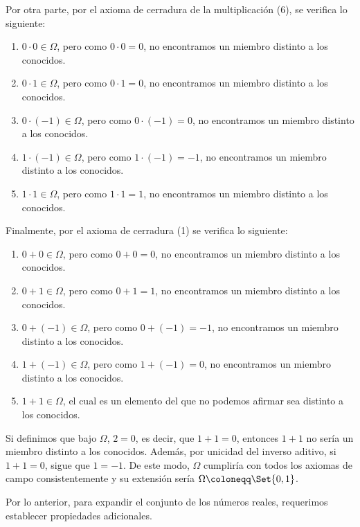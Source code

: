 \documentclass[11pt]{article}
\newcommand{\defined}{\coloneqq}
\let\set\Set
\begin{document}
Por otra parte, por el axioma de cerradura de la multiplicación (6), se verifica lo siguiente:

\begin{enumerate}[label=\roman*)]
    \item $0\cdot 0\in \Omega$, pero como $0\cdot 0=0$, no encontramos un miembro distinto a los conocidos.
    \item $0 \cdot 1 \in \Omega$, pero como $0\cdot 1=0$, no encontramos un miembro distinto a los conocidos. 
    \item $0 \cdot (-1) \in \Omega$, pero como $0\cdot (-1)=0$, no encontramos un miembro distinto a los conocidos.
    \item $1\cdot (-1) \in \Omega$, pero como $1\cdot (-1)=-1$, no encontramos un miembro distinto a los conocidos.
    \item $1\cdot 1\in \Omega$, pero como $1\cdot 1=1$, no encontramos un miembro distinto a los conocidos.
\end{enumerate}
Finalmente, por el axioma de cerradura (1) se verifica lo siguiente:
\begin{enumerate}[label=\roman*)]
    \item $0+0 \in \Omega$, pero como $0+0=0$, no encontramos un miembro distinto a los conocidos.
    \item $0+1 \in \Omega$, pero como $0+1=1$, no encontramos un miembro distinto a los conocidos.
    \item $0+(-1) \in \Omega$, pero como $0+(-1)=-1$, no encontramos un miembro distinto a los conocidos.
    \item $1+(-1)\in \Omega$, pero como $1+(-1)=0$, no encontramos un miembro distinto a los conocidos.
    \item$1+1\in \Omega$, el cual es un elemento del que no podemos afirmar sea distinto a los conocidos.
\end{enumerate}
Si definimos que bajo $\Omega$, $2=0$, es decir, que $1+1=0$, entonces $1+1$ no sería un miembro distinto a los conocidos. Además, por unicidad del inverso aditivo, si $1+1=0$, sigue que $1=-1$. De este modo, $\Omega$ cumpliría con todos los axiomas de campo consistentemente y su extensión sería $\Omega \defined \set{0,1}$.

Por lo anterior, para expandir el conjunto de los números reales, requerimos establecer propiedades adicionales.
%
\end{document}
